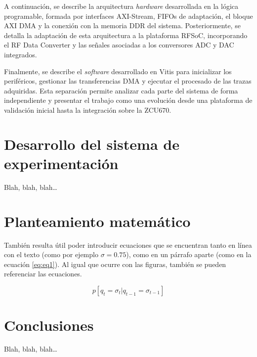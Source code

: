 A continuación, se describe la arquitectura \textit{hardware} desarrollada en la lógica programable, formada por interfaces AXI-Stream, FIFOs de adaptación, el bloque AXI DMA y la conexión con la memoria DDR del sistema. Posteriormente, se detalla la adaptación de esta arquitectura a la plataforma RFSoC, incorporando el RF Data Converter y las señales asociadas a los conversores ADC y DAC integrados.

Finalmente, se describe el \textit{software} desarrollado en Vitis para inicializar los periféricos, gestionar las transferencias DMA y ejecutar el procesado de las trazas adquiridas. Esta separación permite analizar cada parte del sistema de forma independiente y presentar el trabajo como una evolución desde una plataforma de validación inicial hasta la integración sobre la ZCU670.

\section{Desarrollo del sistema de experimentación}
\label{sec:desarr-del-sist}

Blah, blah, blah\ldots


\section{Planteamiento matemático}
\label{sec:libr-desarr}

También resulta útil poder introducir ecuaciones que se encuentran tanto en línea con el texto (como por ejemplo $\sigma=0.75$), como en un párrafo aparte (como en la ecuación \ref{eq:eq1}). Al igual que ocurre con las figuras, también se pueden referenciar las ecuaciones.

\begin{equation}
  \label{eq:eq1}
  p[q_t=\sigma_t|q_{t-1}=\sigma_{t-1}]
\end{equation}

\section{Conclusiones}
\label{sec:conclusiones-desarrollo}

Blah, blah, blah\ldots



